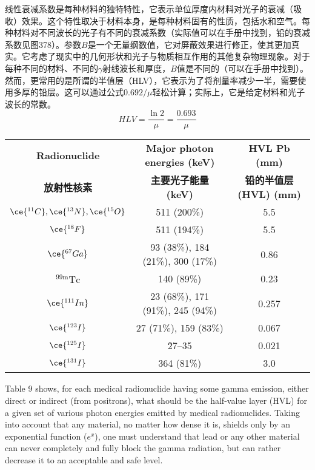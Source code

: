 \documentclass[dvipsnames, svgnames,a4paper,11pt]{article}
\begin{document}
线性衰减系数是每种材料的独特特性，它表示单位厚度内材料对光子的衰减（吸收）效果。这个特性取决于材料本身，是每种材料固有的性质，包括水和空气。每种材料对不同波长的光子有不同的衰减系数（实际值可以在手册中找到，铅的衰减系数见图378）。参数\(B\)是一个无量纲数值，它对屏蔽效果进行修正，使其更加真实。它考虑了现实中的几何形状和光子与物质相互作用的其他复杂物理现象。对于每种不同的材料、不同的$\gamma$射线波长和厚度，\(B\)值是不同的（可以在手册中找到）。然而，更常用的是所谓的半值层（HLV），它表示为了将剂量率减少一半，需要使用多厚的铅层。这可以通过公式\(0.692/\mu\)轻松计算；实际上，它是给定材料和光子波长的常数。
\[
HLV=\frac{\ln2}{\mu} =\frac{0.693}{\mu}
\]

\begin{table}[h!]
\centering
{}\label{table9}
\begin{tabular}{ccc}
\toprule
\textbf{Radionuclide} & \textbf{ Major photon energies (keV)} & \textbf{ HVL Pb (mm)} \\
\textbf{放射性核素} & \textbf{主要光子能量 (keV)} & \textbf{铅的半值层 (HVL) (mm)} \\
\midrule
\(\ce{^{11}C}, \ce{^{13}N}, \ce{^{15}O}\) & 511 (200\%) & 5.5 \\
\(\ce{^{18}F}\) & 511 (194\%) & 5.5 \\
\(\ce{^{67}Ga}\) & 93 (38\%), 184 (21\%), 300 (17\%) & 0.86 \\
\(\mathrm{^{99m}Tc}\) & 140 (89\%) & 0.23 \\
\(\ce{^{111}In}\) & 23 (68\%), 171 (91\%), 245 (94\%) & 0.257 \\
\(\ce{^{123}I}\) & 27 (71\%), 159 (83\%) & 0.067 \\
\(\ce{^{125}I}\) & \~ 27–35 & 0.021 \\
\(\ce{^{131}I}\) & 364 (81\%) & 3.0 \\
\bottomrule
\end{tabular}
\end{table}

Table 9 shows, for each medical radionuclide having some gamma emission, either direct or indirect (from positrons), what should be the half-value layer (HVL) for a given set of various photon energies emitted by medical radionuclides. Taking into account that any material, no matter how dense it is, shields only by an exponential function (\( e^x \)), one must understand that lead or any other material can never completely and fully block the gamma radiation, but can rather decrease it to an acceptable and safe level.
\end{document}
